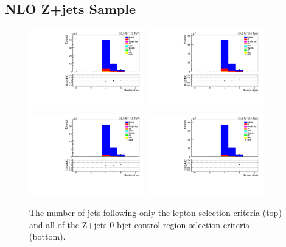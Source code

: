\clearpage
\newpage
\subsection{NLO Z+jets Sample}

\begin{figure}[ht]
\centering
\includegraphics[width=0.45\textwidth]{figs/background-estimation/plots/unblinded/DY_control_old_prompt_ee_DYamcatnlo/numbJets_SingleTop_jetSel_ee.pdf}
\includegraphics[width=0.45\textwidth]{figs/background-estimation/plots/unblinded/DY_control_old_prompt_mumu_DYamcatnlo/numbJets_SingleTop_jetSel_mumu.pdf}
\\
\includegraphics[width=0.45\textwidth]{figs/background-estimation/plots/unblinded/DY_control_old_prompt_ee_DYamcatnlo/numbJets_SingleTop_wMass_ee.pdf}
\includegraphics[width=0.45\textwidth]{figs/background-estimation/plots/unblinded/DY_control_old_prompt_mumu_DYamcatnlo/numbJets_SingleTop_wMass_mumu.pdf}
\caption{
The number of jets following only the lepton selection criteria (top) and all of the Z+jets 0-bjet control region selection criteria (bottom).
}
\label{fig:App_CR_NLO_nJets}
\end{figure}

